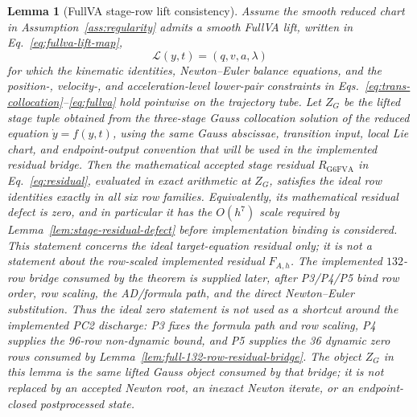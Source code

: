 \documentclass[preprint,12pt]{elsarticle}
\newtheorem{lemma}{Lemma}
\begin{document}
\begin{lemma}[FullVA stage-row lift consistency]
\label{lem:fullva-stage-lift}
Assume the smooth reduced chart in Assumption~\ref{ass:regularity} admits a
smooth FullVA lift, written in Eq.~\eqref{eq:fullva-lift-map},
\begin{equation}
\label{eq:fullva-lift-map}
  \mathcal L(y,t)=(q,v,a,\lambda)
\end{equation}
for which the kinematic identities, Newton--Euler balance equations, and the
position-, velocity-, and acceleration-level lower-pair constraints in
Eqs.~\eqref{eq:trans-collocation}--\eqref{eq:fullva} hold pointwise on the
trajectory tube. Let $Z_G$ be the lifted stage tuple obtained from the
three-stage Gauss collocation solution of the reduced equation
$\dot y=f(y,t)$, using the same Gauss abscissae, transition input, local Lie
chart, and endpoint-output convention that will be used in the implemented
residual bridge. Then the mathematical accepted stage residual
$R_{\mathrm{G6FVA}}$ in Eq.~\eqref{eq:residual}, evaluated in exact
arithmetic at $Z_G$, satisfies the ideal row identities exactly in all six
row families. Equivalently, its mathematical residual defect is zero, and in
particular it has the \(O(h^7)\) scale required by
Lemma~\ref{lem:stage-residual-defect} before implementation binding is
considered.
This statement concerns the ideal target-equation residual only; it is not a
statement about the row-scaled implemented residual \(F_{A,h}\).  The
implemented \(132\)-row bridge consumed by the theorem is supplied later,
after P3/P4/P5 bind row order, row scaling, the AD/formula path, and the
direct Newton--Euler substitution.
Thus the ideal zero statement is not used as a shortcut around the implemented
PC2 discharge: P3 fixes the formula path and row scaling, P4 supplies the
96-row non-dynamic bound, and P5 supplies the 36 dynamic zero rows consumed by
Lemma~\ref{lem:full-132-row-residual-bridge}.
The object \(Z_G\) in this lemma is the same lifted Gauss object consumed by
that bridge; it is not replaced by an accepted Newton root, an inexact Newton
iterate, or an endpoint-closed postprocessed state.
\end{lemma}
\end{document}

